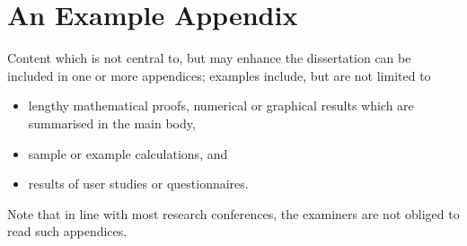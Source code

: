 \documentclass[ %
                    author={Carlos Duran Calle},
                supervisor={Dr. Felipe Campelo},
                    degree={MSc},
                     title={Comparative Machine Learning Analysis for Student Dropout Prediction in a Virtual Learning Environment},
                  subtitle={Incorporating Student Engagement and Socio-Economic Features},
                      type={},
                      year={2025}]{dissertation}
\begin{document}

%
%

\backmatter

%




\appendix

\chapter{An Example Appendix}
\label{appx:example}

Content which is not central to, but may enhance the dissertation can be 
included in one or more appendices; examples include, but are not limited
to

\begin{itemize}
\item lengthy mathematical proofs, numerical or graphical results which 
      are summarised in the main body,
\item sample or example calculations, 
      and
\item results of user studies or questionnaires.
\end{itemize}

\noindent
Note that in line with most research conferences, the examiners are not
obliged to read such appendices.

\end{document}
